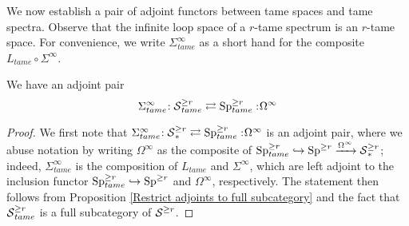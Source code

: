 We now establish a pair of adjoint functors between tame spaces and tame spectra.
Observe that the infinite loop space of a $r$-tame spectrum is an $r$-tame space. For convenience, we write $\Sigma^{\infty}_{tame}$ as a short hand for the composite $L_{tame}\circ \Sigma^{\infty}$.
\begin{proposition}
	We have an adjoint pair
	\[
	\Sigma^{\infty}_{tame}\negmedspace: \operatorname{\mathcal{S}}^{\geq r}_{tame}\rightleftarrows \operatorname{Sp}^{\geq r}_{tame}:\negmedspace \Omega^{\infty}
	\]
\end{proposition}
\begin{proof}
	We first note that $\Sigma^{\infty}_{tame}\negmedspace: \operatorname{\mathcal{S}}_{*}^{\geq r}\rightleftarrows \operatorname{Sp}^{\geq r}_{tame}:\negmedspace \Omega^\infty$ is an adjoint pair, where we abuse notation by writing $\Omega^{\infty}$ as the composite of $\operatorname{Sp}^{\geq r}_{tame}\hookrightarrow \operatorname{Sp}^{\geq r} \xrightarrow{\Omega^\infty} \operatorname{\mathcal{S}}^{\geq r}_{*}$; indeed, $\Sigma^{\infty}_{tame}$ is the composition of $L_{tame}$ and $\Sigma^\infty$, which are left adjoint to the inclusion functor $\operatorname{Sp}^{\geq r}_{tame}\hookrightarrow \operatorname{Sp}^{\geq r}$ and $\Omega^\infty$, respectively. The statement then follows from Proposition \ref{Restrict adjoints to full subcategory} and the fact that $\operatorname{\mathcal{S}}_{tame}^{\geq r}$ is a full subcategory of $\operatorname{\mathcal{S}}^{\geq r}$. 
\end{proof}


